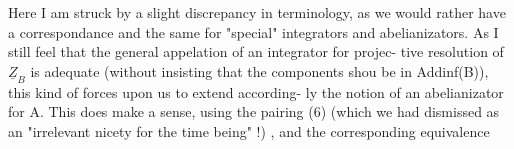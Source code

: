 Here I am struck by a slight discrepancy in terminology, as we
would rather have a correspondance
and the same for "special" integrators and abelianizators. As I still
feel that the general  appelation of an integrator for \hand{\uline{\textcolor{black}{any}}} projec-%
tive resolution of $\underline{Z}_B$ is adequate (without insisting that the components
shou be in Addinf(B)), this kind of forces upon us to extend according-%
ly  the notion of an abelianizator for A. This does make a sense, using
the pairing (6) (which we had dismissed as an "irrelevant nicety for
the time being" !) , and the corresponding equivalence


